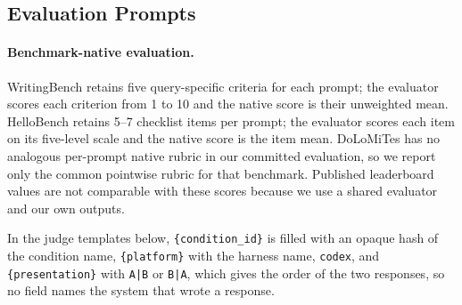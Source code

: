 


\subsection{Evaluation Prompts}

\paragraph{Benchmark-native evaluation.}
WritingBench retains five query-specific criteria for each prompt; the evaluator scores each criterion from 1 to 10 and the native score is their unweighted mean.
HelloBench retains 5--7 checklist items per prompt; the evaluator scores each item on its five-level scale and the native score is the item mean.
DoLoMiTes has no analogous per-prompt native rubric in our committed evaluation, so we report only the common pointwise rubric for that benchmark.
Published leaderboard values are not comparable with these scores because we use a shared evaluator and our own outputs.

In the judge templates below, \texttt{\{condition\_id\}} is filled with an opaque hash of the condition name, \texttt{\{platform\}} with the harness name, \texttt{codex}, and \texttt{\{presentation\}} with \texttt{A|B} or \texttt{B|A}, which gives the order of the two responses, so no field names the system that wrote a response.




